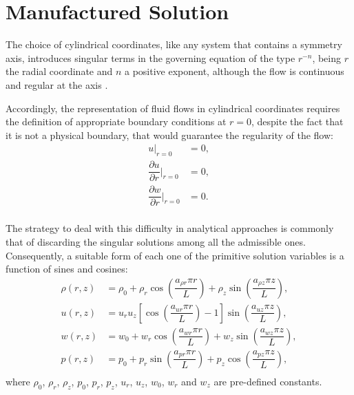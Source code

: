 \documentclass[10pt]{article}
\newcommand{\diff}[2] {\dfrac{\partial #1}{\partial #2}}
\begin{document}
\section{Manufactured Solution}

The choice of cylindrical coordinates, like any system that contains a symmetry axis, introduces singular terms in the governing equation of the type $r^{-n}$, being $r$ the radial coordinate and $n$ a positive exponent, %
 although the flow is continuous and regular at the axis \cite{Domenichini2004}.


Accordingly, the representation of fluid flows in cylindrical coordinates requires the definition of appropriate boundary conditions at $r=0$, despite the fact that it is not a physical boundary, that would guarantee the regularity of the flow: %
\begin{equation}
\label{cc}
\begin{split}
u \big| _{r=0} &=0,\\
 \diff{u}{r}\Big| _{r=0} &=0,\\
\diff{w}{r}\Big| _{r=0} &=0.\\
\end{split}
\end{equation}

The strategy to deal with this difficulty in analytical approaches is commonly that of discarding the singular solutions among all the admissible ones. %
Consequently, a suitable form of each one of the primitive solution variables is a function of sines and cosines:
\begin{equation}
 \label{eq:manufactured01}
\begin{split}
\rho(r,z)&= \rho_0+\rho_r \cos\left(\dfrac{a_{\rho r} \pi r}{L}\right)+\rho_z \sin\left(\dfrac{a_{\rho z} \pi z}{L}\right),\\
u(r,z)&= u_r u_z \left[\cos\left(\dfrac{a_{ur} \pi r}{L}\right)-1\right]\sin\left(\dfrac{a_{uz} \pi z}{L}\right),\\
w(r,z)&=w_0+w_r \cos\left(\dfrac{a_{w r} \pi r}{L}\right)+w_z \sin\left(\dfrac{a_{w z} \pi z}{L}\right),\\
p(r,z)&=p_0+p_r \sin\left(\dfrac{a_{p r} \pi r}{L}\right)+p_z \cos\left(\dfrac{a_{p z} \pi z}{L}\right),\\
\end{split}
\end{equation}
%
where $\rho_0$, $\rho_r$,  $\rho_z$, $p_0$, $p_r$, $p_z$, $u_r$, $u_z$, $w_0$, $w_r$ and $w_z$ are pre-defined constants.
\end{document}
